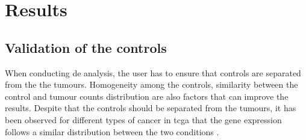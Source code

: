 \section{Results}

\subsection{Validation of the controls}

When conducting \acrlong{de} analysis, the user has to ensure that controls are separated from the the tumours.
Homogeneity among the controls, similarity between the control and tumour counts distribution are also factors that can improve the results.
Despite that the controls should be separated from the tumours, it has been observed for different types of cancer in \acrshort{tcga} that the gene expression follows a similar distribution between the two conditions \cite*{Decamps2021}.

